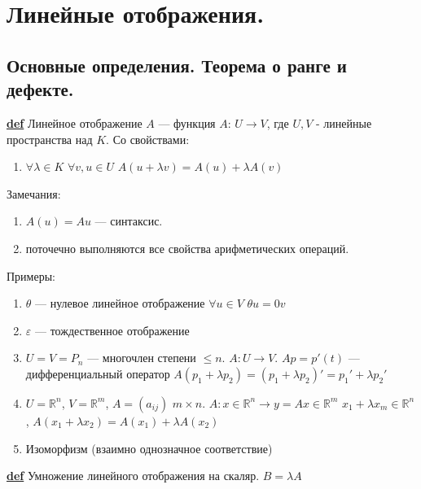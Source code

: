 \documentclass[12pt,a4paper]{article}
\author{Stepavly}
\newcommand{\bfline}[1]{\textbf{\underline{#1}}}
\newcommand{\Def}{\bfline{def} }
\newcommand{\R}{\mathbb{R}}
\begin{document}
\section{Линейные отображения.}
\subsection{Основные определения. Теорема о ранге и дефекте.}
\Def Линейное отображение $A$ --- функция $A$: $U \rightarrow V$, где $U, V$ - линейные пространства над $K$. Со свойствами:
\begin{enumerate}
	\item $\forall \lambda \in K$ $\forall v, u \in U$ \newline
		  $A(u+\lambda v)=A(u)+\lambda A(v)$
\end{enumerate}
Замечания:
\begin{enumerate}
	\item $A(u) = A u$ --- синтаксис.
	\item поточечно выполняются все свойства арифметических операций.
\end{enumerate}
Примеры:
\begin{enumerate}
	\item $\theta$ --- нулевое линейное отображение \newline
		  $\forall u \in V$ $\theta u = 0v$
		  
	\item $\varepsilon$ --- тождественное отображение

	\item $U = V = P_n$ --- многочлен степени $\leq n$. $A: U \rightarrow V$. \newline
		  $Ap = p'(t)$ --- дифференциальный оператор \newline
		  $A(p_1 + \lambda p_2) = (p_1 + \lambda p_2)' = p_1' + \lambda p_2'$

	\item $U = \mathbb{R}^n$, $V = \R^m$, $A=(a_{i j})$ $m \times n$. \newline
		  $A: x \in \R^n \rightarrow y = Ax \in \R^m$ \newline
		  $x_1 + \lambda x_m \in \R^n$, $A(x_1 + \lambda x_2) = A(x_1) + \lambda A(x_2)$

	\item Изоморфизм (взаимно однозначное соответствие)
\end{enumerate}
\Def Умножение линейного отображения на скаляр. \newline
$B = \lambda A$ \newline
\end{document}
